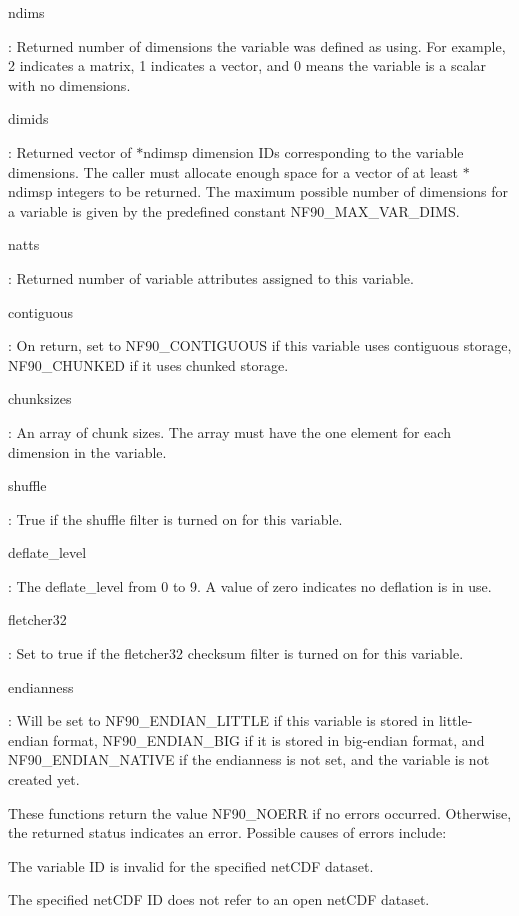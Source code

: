 {\ttfamily ndims}

\+: Returned number of dimensions the variable was defined as using. For example, 2 indicates a matrix, 1 indicates a vector, and 0 means the variable is a scalar with no dimensions.

{\ttfamily dimids}

\+: Returned vector of $\ast$ndimsp dimension I\+Ds corresponding to the variable dimensions. The caller must allocate enough space for a vector of at least $\ast$ndimsp integers to be returned. The maximum possible number of dimensions for a variable is given by the predefined constant N\+F90\+\_\+\+M\+A\+X\+\_\+\+V\+A\+R\+\_\+\+D\+I\+MS.

{\ttfamily natts}

\+: Returned number of variable attributes assigned to this variable.

{\ttfamily contiguous}

\+: On return, set to N\+F90\+\_\+\+C\+O\+N\+T\+I\+G\+U\+O\+US if this variable uses contiguous storage, N\+F90\+\_\+\+C\+H\+U\+N\+K\+ED if it uses chunked storage.

{\ttfamily chunksizes}

\+: An array of chunk sizes. The array must have the one element for each dimension in the variable.

{\ttfamily shuffle}

\+: True if the shuffle filter is turned on for this variable.

{\ttfamily deflate\+\_\+level}

\+: The deflate\+\_\+level from 0 to 9. A value of zero indicates no deflation is in use.

{\ttfamily fletcher32}

\+: Set to true if the fletcher32 checksum filter is turned on for this variable.

{\ttfamily endianness}

\+: Will be set to N\+F90\+\_\+\+E\+N\+D\+I\+A\+N\+\_\+\+L\+I\+T\+T\+LE if this variable is stored in little-\/endian format, N\+F90\+\_\+\+E\+N\+D\+I\+A\+N\+\_\+\+B\+IG if it is stored in big-\/endian format, and N\+F90\+\_\+\+E\+N\+D\+I\+A\+N\+\_\+\+N\+A\+T\+I\+VE if the endianness is not set, and the variable is not created yet.

These functions return the value N\+F90\+\_\+\+N\+O\+E\+RR if no errors occurred. Otherwise, the returned status indicates an error. Possible causes of errors include\+:


\begin{DoxyItemize}
\item The variable ID is invalid for the specified net\+C\+DF dataset.
\item The specified net\+C\+DF ID does not refer to an open net\+C\+DF dataset.
\end{DoxyItemize}

